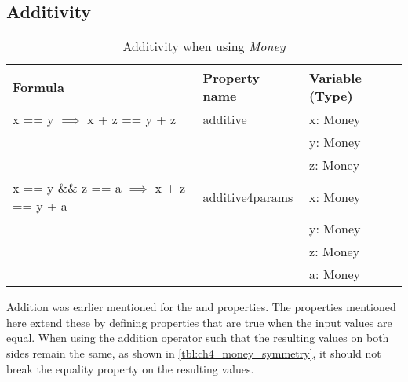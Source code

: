 \subsection*{Additivity}
\label{ssct:properties_additivity}
\FloatBarrier
\begin{table}[!ht]
\centering
\begin{tabular}{lll}
\hline
                        \textbf{Formula}                             & \textbf{Property name} & \textbf{Variable (Type)} \\ \hline
\rowcolor[HTML]{EFEFEF} x == y $\implies$ x + z == y + z             & additive               & x: Money                 \\
\rowcolor[HTML]{EFEFEF}                                              &                        & y: Money                 \\
\rowcolor[HTML]{EFEFEF}                                              &                        & z: Money                 \\
                        x == y \&\& z == a $\implies$ x + z == y + a & additive4params        & x: Money                 \\
                                                                     &                        & y: Money                 \\
                                                                     &                        & z: Money                 \\
                                                                     &                        & a: Money                 \\ \hline
\end{tabular}
\caption{Additivity when using \textit{Money}}
\label{tbl:ch4_money_additivity}
\end{table}
\FloatBarrier
Addition was earlier mentioned for the 
and  properties. The properties mentioned
here extend these by defining properties that are true when the input values are
equal. When using the addition operator such that the resulting values on both
sides remain the same, as shown in \autoref{tbl:ch4_money_symmetry}, it should
not break the equality property on the resulting values.

